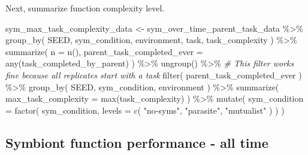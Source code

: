 \documentclass[
]{book}
\newenvironment{Shaded}{\begin{snugshade}}{\end{snugshade}}
\newcommand{\AttributeTok}[1]{\textcolor[rgb]{0.77,0.63,0.00}{#1}}
\newcommand{\CommentTok}[1]{\textcolor[rgb]{0.56,0.35,0.01}{\textit{#1}}}
\newcommand{\FunctionTok}[1]{\textcolor[rgb]{0.00,0.00,0.00}{#1}}
\newcommand{\NormalTok}[1]{#1}
\newcommand{\OtherTok}[1]{\textcolor[rgb]{0.56,0.35,0.01}{#1}}
\newcommand{\SpecialCharTok}[1]{\textcolor[rgb]{0.00,0.00,0.00}{#1}}
\newcommand{\StringTok}[1]{\textcolor[rgb]{0.31,0.60,0.02}{#1}}
\begin{document}
Next, summarize function complexity level.

\begin{Shaded}
\begin{Highlighting}[]
\NormalTok{sym\_max\_task\_complexity\_data }\OtherTok{\textless{}{-}}\NormalTok{ sym\_over\_time\_parent\_task\_data }\SpecialCharTok{\%\textgreater{}\%}
  \FunctionTok{group\_by}\NormalTok{(}
\NormalTok{    SEED,}
\NormalTok{    sym\_condition,}
\NormalTok{    environment,}
\NormalTok{    task,}
\NormalTok{    task\_complexity}
\NormalTok{  ) }\SpecialCharTok{\%\textgreater{}\%}
  \FunctionTok{summarize}\NormalTok{(}
    \AttributeTok{n =} \FunctionTok{n}\NormalTok{(),}
    \AttributeTok{parent\_task\_completed\_ever =} \FunctionTok{any}\NormalTok{(task\_completed\_by\_parent)}
\NormalTok{  ) }\SpecialCharTok{\%\textgreater{}\%}
  \FunctionTok{ungroup}\NormalTok{() }\SpecialCharTok{\%\textgreater{}\%}
  \CommentTok{\# This filter works fine because all replicates start with a task}
  \FunctionTok{filter}\NormalTok{(}
\NormalTok{    parent\_task\_completed\_ever}
\NormalTok{  ) }\SpecialCharTok{\%\textgreater{}\%}
  \FunctionTok{group\_by}\NormalTok{(}
\NormalTok{    SEED,}
\NormalTok{    sym\_condition,}
\NormalTok{    environment}
\NormalTok{  ) }\SpecialCharTok{\%\textgreater{}\%}
  \FunctionTok{summarize}\NormalTok{(}
    \AttributeTok{max\_task\_complexity =} \FunctionTok{max}\NormalTok{(task\_complexity)}
\NormalTok{  ) }\SpecialCharTok{\%\textgreater{}\%}
  \FunctionTok{mutate}\NormalTok{(}
    \AttributeTok{sym\_condition =} \FunctionTok{factor}\NormalTok{(}
\NormalTok{      sym\_condition,}
      \AttributeTok{levels =} \FunctionTok{c}\NormalTok{(}
        \StringTok{"no{-}syms"}\NormalTok{,}
        \StringTok{"parasite"}\NormalTok{,}
        \StringTok{"mutualist"}
\NormalTok{      )}
\NormalTok{    )}
\NormalTok{  )}
\end{Highlighting}
\end{Shaded}

\hypertarget{symbiont-function-performance---all-time-2}{%
\subsection{Symbiont function performance - all time}\label{symbiont-function-performance---all-time-2}}
\end{document}
